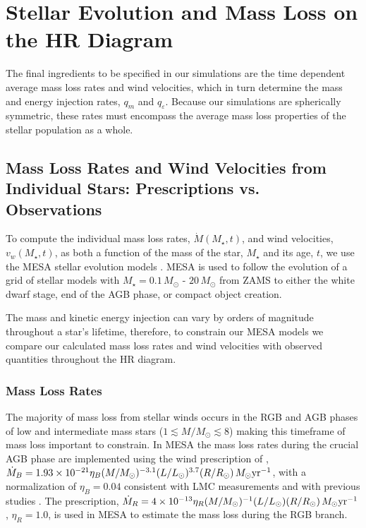 \documentclass[fleqn,usenatbib]{mnras}
\begin{document}
\section{Stellar Evolution and Mass Loss on the HR Diagram} \label{section:stellarEvolution}

The final ingredients to be specified in our simulations are the time dependent average mass loss rates and wind velocities, which in turn determine the mass and energy injection rates, $q_m$ and $q_\varepsilon$.  Because our simulations are spherically symmetric, these rates must encompass the average mass loss properties of the stellar population as a whole.

\subsection{Mass Loss Rates and Wind Velocities from Individual Stars: Prescriptions vs. Observations}

 To compute the individual mass loss rates, $\dot{M}(M_\star,t)$,  and wind velocities, $v_w(M_\star,t)$,  as both a function of the mass of the star, $M_\star$ and its age, $t$, we use the MESA stellar evolution models \citep{paxton2011}.
MESA is used to follow the evolution of a grid of stellar models with $M_\star = 0.1 \, M_\odot$ - 
$20 \, M_\odot$ from ZAMS to either the white dwarf stage, end of the AGB phase, or 
compact object creation.

 The mass and kinetic energy injection can vary by orders of magnitude throughout a star's lifetime, therefore, to constrain our MESA models we compare our calculated mass loss rates and wind velocities with observed quantities throughout the HR diagram. 




\subsubsection{Mass Loss Rates} \label{section:masslossrates}


The majority of mass loss from stellar winds occurs in the RGB and AGB phases of low and intermediate mass stars ($1 \lesssim M/M_\odot \lesssim 8$) making this timeframe of mass loss important to constrain.
In MESA the mass loss rates during the crucial AGB phase are implemented using 
the wind prescription of  \citet{blocker1995}, $\dot{M}_B = 1.93 \times 10^{-21}  \eta_B (M/M_\odot)^{-3.1} (L/L_\odot)^{3.7} (R/R_\odot) \, M_\odot {\rm yr^{-1}}$, with a normalization of $\eta_B = 0.04$ consistent with LMC measurements \citep{ventura2000} 
and with previous studies \citep{dercole2008,dercole2010,conroy2011b}.  
 The \cite{reimers1975} prescription, $\dot{M}_R = 4 \times 10^{-13}  \eta_R (M/M_\odot)^{-1} (L/L_\odot) (R/R_\odot) \, M_\odot {\rm yr^{-1}}$, $\eta_R = 1.0$,  is used in MESA to estimate the mass loss during the RGB branch.   
\end{document}
